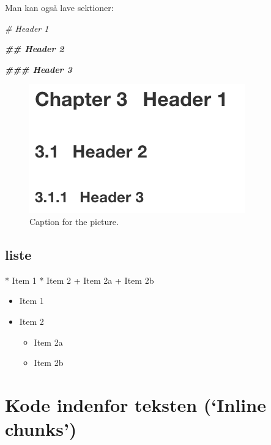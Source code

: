\documentclass[
]{book}
\newenvironment{Shaded}{\begin{snugshade}}{\end{snugshade}}
\newcommand{\CommentTok}[1]{\textcolor[rgb]{0.56,0.35,0.01}{\textit{#1}}}
\newcommand{\DecValTok}[1]{\textcolor[rgb]{0.00,0.00,0.81}{#1}}
\newcommand{\DocumentationTok}[1]{\textcolor[rgb]{0.56,0.35,0.01}{\textbf{\textit{#1}}}}
\newcommand{\NormalTok}[1]{#1}
\newcommand{\SpecialCharTok}[1]{\textcolor[rgb]{0.00,0.00,0.00}{#1}}
\providecommand{\tightlist}{%
  \setlength{\itemsep}{0pt}\setlength{\parskip}{0pt}}
\begin{document}
Man kan også lave sektioner:

\begin{Shaded}
\begin{Highlighting}[]
\CommentTok{\# Header 1}

\DocumentationTok{\#\# Header 2}

\DocumentationTok{\#\#\# Header 3}
\end{Highlighting}
\end{Shaded}

\begin{figure}
\centering
\includegraphics{header_eksempel.png}
\caption{Caption for the picture.}
\end{figure}

\hypertarget{liste}{%
\subsection{liste}\label{liste}}

\begin{Shaded}
\begin{Highlighting}[]
\SpecialCharTok{*}\NormalTok{ Item }\DecValTok{1}
\SpecialCharTok{*}\NormalTok{ Item }\DecValTok{2}
    \SpecialCharTok{+}\NormalTok{ Item 2a}
    \SpecialCharTok{+}\NormalTok{ Item 2b}
\end{Highlighting}
\end{Shaded}

\begin{itemize}
\tightlist
\item
  Item 1
\item
  Item 2

  \begin{itemize}
  \tightlist
  \item
    Item 2a
  \item
    Item 2b
  \end{itemize}
\end{itemize}

\hypertarget{kode-indenfor-teksten-inline-chunks}{%
\section{Kode indenfor teksten (`Inline chunks')}\label{kode-indenfor-teksten-inline-chunks}}
\end{document}
